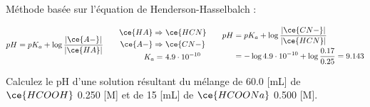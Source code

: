 \documentclass[
  11pt,
  a4paper,
  openany]{book}
\begin{document}
\begin{Answer}
Méthode basée sur l'équation de Henderson-Hasselbalch :

\[
\begin{split}
  pH = pK_a + \log \frac{|\ce{A-}|}{|\ce{HA}|}
\end{split}
\qquad
\begin{split}
  \ce{HA} \Rightarrow &\ \ce{HCN} \\
  \ce{A-} \Rightarrow &\ \ce{CN-} \\
  K_a = &\ 4.9 \cdot 10^{-10}
\end{split}
\qquad
\begin{split}
  pH &= pK_a + \log \frac{|\ce{CN-}|}{|\ce{HCN}|} \\
  &= - \log 4.9 \cdot 10^{-10} + \log \frac{0.17}{0.25} = 9.143 \\
\end{split}
\]

\end{Answer}

\begin{Exercise}
Calculez le pH d'une solution résultant du mélange de 60.0 {[}mL{]} de \(\ce{HCOOH}\) 0.250 {[}M{]} et de 15 {[}mL{]} de \(\ce{HCOONa}\) 0.500 {[}M{]}.

\end{Exercise}
\end{document}
